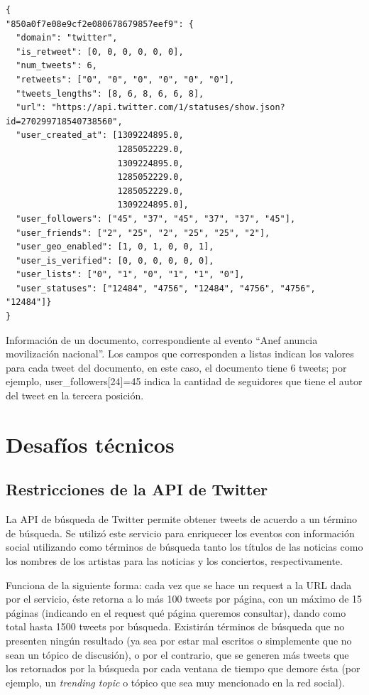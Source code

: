\documentclass[upright, contnum]{umemoria}
\begin{document}
\begin{listing}
\begin{verbatim}
{
"850a0f7e08e9cf2e080678679857eef9": {
  "domain": "twitter",
  "is_retweet": [0, 0, 0, 0, 0, 0],
  "num_tweets": 6,
  "retweets": ["0", "0", "0", "0", "0", "0"],
  "tweets_lengths": [8, 6, 8, 6, 6, 8],
  "url": "https://api.twitter.com/1/statuses/show.json?id=270299718540738560",
  "user_created_at": [1309224895.0,
                      1285052229.0,
                      1309224895.0,
                      1285052229.0,
                      1285052229.0,
                      1309224895.0],
  "user_followers": ["45", "37", "45", "37", "37", "45"],
  "user_friends": ["2", "25", "2", "25", "25", "2"],
  "user_geo_enabled": [1, 0, 1, 0, 0, 1],
  "user_is_verified": [0, 0, 0, 0, 0, 0],
  "user_lists": ["0", "1", "0", "1", "1", "0"],
  "user_statuses": ["12484", "4756", "12484", "4756", "4756", "12484"]}
}
\end{verbatim}
\caption{Información de un documento, correspondiente al evento ``Anef
anuncia movilización nacional''. Los campos que corresponden a listas
indican los valores para cada tweet del documento, en este caso, el
documento tiene 6 tweets; por ejemplo, user\_followers[24]=45 indica
la cantidad de seguidores que tiene el autor del tweet en la tercera
posición.}
\label{fig:doc-example}
\end{listing}

   

   


\section{Desafíos técnicos}
\label{sec-4.3}

\subsection{Restricciones de la API de Twitter}
\label{sec-4.3.1}


   La API de búsqueda de Twitter permite obtener tweets de acuerdo a un
   término de búsqueda. Se utilizó este servicio para enriquecer los
   eventos con información social utilizando como términos de búsqueda
   tanto los títulos de las noticias como los nombres de los artistas
   para las noticias y los conciertos, respectivamente. 
   
   Funciona de la siguiente forma: cada vez que se hace un request a la
   URL dada por el servicio, éste retorna a lo más 100 tweets por página, con un
   máximo de 15 páginas (indicando en el request qué página queremos
   consultar), dando como total hasta 1500 tweets por búsqueda. Existirán
   términos de búsqueda que no presenten ningún resultado  (ya sea por
   estar mal escritos o simplemente que no sean un tópico de discusión), o por
   el contrario, que se generen más tweets que los retornados por la
   búsqueda por cada ventana de tiempo que demore ésta (por ejemplo, un
   \emph{trending topic} o tópico que sea muy mencionado en la red social).
   
\end{document}
